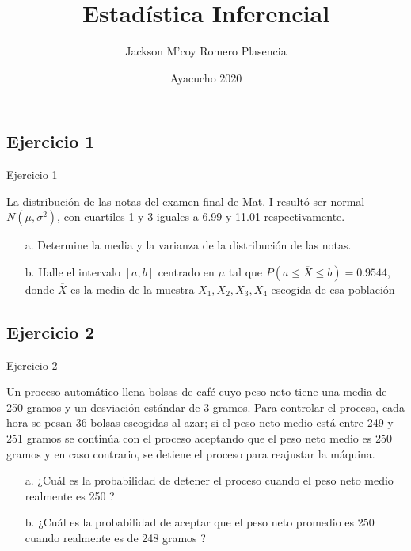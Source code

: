 \documentclass[
  ignorenonframetext,
]{beamer}
\title{Estadística Inferencial}
\author{Jackson M'coy Romero Plasencia}
\date{Ayacucho 2020}
\institute{\large Universidad Nacional de San Cristóbal de Huamanga \and \normalsize Departamento Académico de Matemática y Física}
\begin{document}
\frame{\titlepage}

\begin{frame}
  \tableofcontents[hideallsubsections]
\end{frame}
\hypertarget{ejercicio-1}{%
\subsection{Ejercicio 1}\label{ejercicio-1}}

\begin{frame}{Ejercicio 1}

\justifying   La distribución de las notas del examen final de Mat. I
resultó ser normal \(N(\mu,\sigma^2)\), con cuartiles 1 y 3 iguales a
6.99 y 11.01 respectivamente.

\begin{itemize}\justifying 
  \item [a.] Determine la media y la varianza de la distribución de las notas.
  \item [b.] Halle el intervalo $[a,b] $ centrado en $\mu$ tal que $P( a\leq\overline{X} \leq b)=0.9544$, donde $\overline{X}$ es la media de la muestra $X_1,X_2,X_3, X_4$ escogida de esa población 
\end{itemize}

\end{frame}

\hypertarget{ejercicio-2}{%
\subsection{Ejercicio 2}\label{ejercicio-2}}

\begin{frame}{Ejercicio 2}

\justifying Un proceso automático llena bolsas de café cuyo peso neto
tiene una media de 250 gramos y un desviación estándar de 3 gramos. Para
controlar el proceso, cada hora se pesan 36 bolsas escogidas al azar; si
el peso neto medio está entre 249 y 251 gramos se continúa con el
proceso aceptando que el peso neto medio es 250 gramos y en caso
contrario, se detiene el proceso para reajustar la máquina.

\begin{itemize}\justifying 
  \item [a.] ¿Cuál es la probabilidad de detener el proceso cuando el peso neto medio realmente es 250 ?
  \item [b.] ¿Cuál es la probabilidad de aceptar que el peso neto promedio es 250 cuando realmente es de 248 gramos ? 
\end{itemize}

\end{frame}
\end{document}

